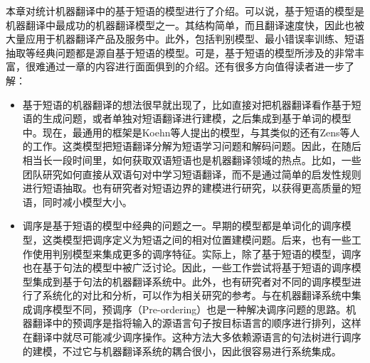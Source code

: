\parinterval 本章对统计机器翻译中的基于短语的模型进行了介绍。可以说，基于短语的模型是机器翻译中最成功的机器翻译模型之一。其结构简单，而且翻译速度快，因此也被大量应用于机器翻译产品及服务中。此外，包括判别模型、最小错误率训练、短语抽取等经典问题都是源自基于短语的模型。可是，基于短语的模型所涉及的非常丰富，很难通过一章的内容进行面面俱到的介绍。还有很多方向值得读者进一步了解：

\begin{itemize}
\vspace{0.5em}
\item 基于短语的机器翻译的想法很早就出现了，比如直接对把机器翻译看作基于短语的生成问题，或者单独对短语翻译进行建模，之后集成到基于单词的模型中。现在，最通用的框架是Koehn等人提出的模型，与其类似的还有Zens等人的工作。这类模型把短语翻译分解为短语学习问题和解码问题。因此，在随后相当长一段时间里，如何获取双语短语也是机器翻译领域的热点。比如，一些团队研究如何直接从双语句对中学习短语翻译，而不是通过简单的启发性规则进行短语抽取。也有研究者对短语边界的建模进行研究，以获得更高质量的短语，同时减小模型大小。
\vspace{0.5em}
\item 调序是基于短语的模型中经典的问题之一。早期的模型都是单词化的调序模型，这类模型把调序定义为短语之间的相对位置建模问题。后来，也有一些工作使用判别模型来集成更多的调序特征。实际上，除了基于短语的模型，调序也在基于句法的模型中被广泛讨论。因此，一些工作尝试将基于短语的调序模型集成到基于句法的机器翻译系统中。此外，也有研究者对不同的调序模型进行了系统化的对比和分析，可以作为相关研究的参考。与在机器翻译系统中集成调序模型不同，预调序（Pre-ordering）也是一种解决调序问题的思路。机器翻译中的预调序是指将输入的源语言句子按目标语言的顺序进行排列，这样在翻译中就尽可能减少调序操作。这种方法大多依赖源语言的句法树进行调序的建模，不过它与机器翻译系统的耦合很小，因此很容易进行系统集成。

\end{itemize}
